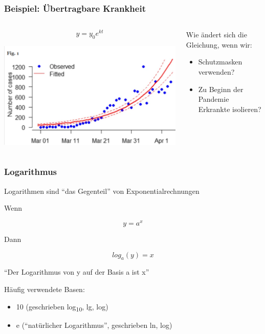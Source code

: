 \documentclass{beamer}
\begin{document}
\begin{frame}
\frametitle{Beispiel: Übertragbare Krankheit}

\begin{columns}[c]
\begin{column}{5cm}

\[
y = y_0 e^{kt}
\] 


\begin{center}

\includegraphics[width=\textwidth]{Covid19_Africa.png}
\end{center}



\end{column}
\begin{column}{5cm}

Wie ändert sich die Gleichung, wenn wir:

\begin{itemize}
\item
Schutzmasken verwenden? 
\item
Zu Beginn der Pandemie Erkrankte isolieren?
\end{itemize}


\end{column}
\end{columns}


\end{frame}



\begin{frame}
\frametitle{Logarithmus}

Logarithmen sind ``das Gegenteil'' von Exponentialrechnungen

Wenn 

\[
y = a^x
\]

Dann

\[
log_a(y) = x
\]


``Der Logarithmus von y auf der Basis a ist x'' 


\pause

Häufig verwendete Basen: 

\begin{itemize}
\item
10 (geschrieben log\textsubscript{10}, lg, log)
\item
e (``natürlicher Logarithmus'', geschrieben ln, log)
\end{itemize}

\end{frame}
\end{document}
